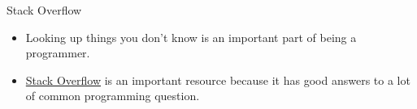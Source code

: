 \begin{frame}{Stack Overflow}

 \begin{itemize}

  \item Looking up things you don't know is an important part of being a 
   programmer.

  \item \href{http://stackoverflow.com/}{Stack Overflow} is an important 
   resource because it has good answers to a lot of common programming 
   question.

 \end{itemize}

\end{frame}
